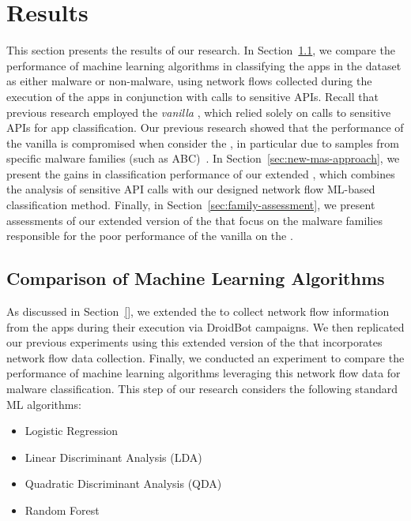 \section{Results}\label{sec:results}

This section presents the results of our research. In Section~\ref{sec:ml}, we compare the
performance of machine learning algorithms in classifying the apps in the \cds dataset
as either malware or non-malware, using network flows collected during the execution of the apps
in conjunction with calls to sensitive APIs. Recall that previous research employed the \emph{vanilla}
\mas, which relied solely on calls to sensitive APIs for app classification. Our previous
research showed that the performance of the vanilla \mas is compromised when consider
the \cds, in particular due to samples from specific malware families {\color{red}(such as ABC)~\cite{}}.
In Section~\ref{sec:new-mas-approach}, we present the gains in classification performance of our extended \mas,
which combines the analysis of sensitive API calls with our designed network flow ML-based classification method.
Finally, in Section~\ref{sec:family-assessment}, we present assessments of our extended
version of the \mas that focus on the malware families responsible for the poor performance of
the vanilla \mas on the \cds.

\subsection{Comparison of Machine Learning Algorithms}\label{sec:ml}


As discussed {\color{red}in Section~\ref{}}, we extended the \mas to collect network
flow information from the apps during their execution via DroidBot campaigns.
We then replicated our previous experiments using this extended version of the \mas
that incorporates network flow data collection. Finally, we conducted an experiment to
compare the performance of machine learning algorithms leveraging this network flow data
for malware classification. This step of our research considers the following standard ML algorithms:

\begin{itemize}
 \item Logistic Regression 
 \item Linear Discriminant Analysis (LDA)
 \item Quadratic Discriminant Analysis (QDA)
 \item Random Forest
\end{itemize}


